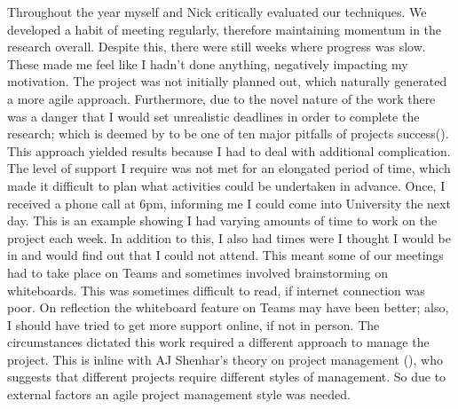 Throughout the year myself and Nick critically evaluated our techniques. We developed a habit of meeting regularly, therefore maintaining momentum in the research overall. Despite this, there were still weeks where progress was slow. These made me feel like I hadn't done anything, negatively impacting my motivation. The project was not initially planned out, which naturally generated a more agile approach. Furthermore, due to the novel nature of the work there was a danger that I would set unrealistic deadlines in order to complete the research; which is deemed by \citeauthor{GanttPRO} to be one of ten major pitfalls of projects success(\cite{GanttPRO}). This approach yielded results because I had to deal with additional complication. The level of support I require was not met for an elongated period of time, which made it difficult to plan what activities could be undertaken in advance. Once, I received a phone call at 6pm, informing me I could come into University the next day. This is an example showing I had varying amounts of time to work on the project each week. In addition to this, I also had times were I thought I would be in and would find out that I could not attend. This meant some of our meetings had to take place on Teams and sometimes involved brainstorming on whiteboards. This was sometimes difficult to read, if internet connection was poor. On reflection the whiteboard feature on Teams may have been better; also, I should have tried to get more support online, if not in person. The circumstances dictated this work required a different approach to manage the project. This is inline with AJ Shenhar's theory on project management (\cite{Shenhar1}), who suggests that different projects require different styles of management. So due to external factors an agile project management style was needed.



